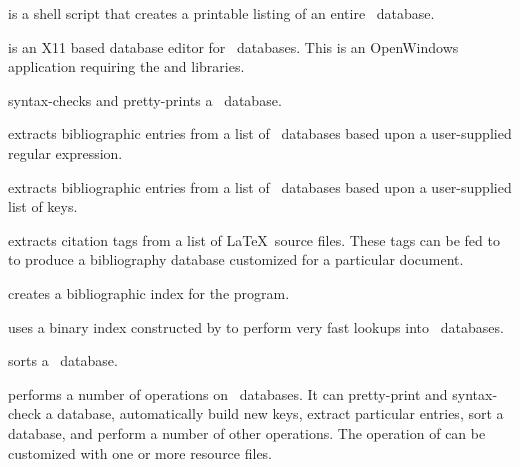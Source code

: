 
 is a shell script that creates a printable listing
of an entire \BibTeX\ database.


 is an X11 based database editor for \BibTeX\ databases.
This is an OpenWindows application requiring the  and
 libraries.


 syntax-checks
and pretty-prints a \BibTeX\ database.


 extracts bibliographic entries from a list of
\BibTeX\ databases based upon a user-supplied regular expression.


 extracts bibliographic entries from a list of
\BibTeX\ databases based upon a user-supplied list of keys.

\newpage
{}

 extracts citation tags from a list of \LaTeX\
source files.  These tags can be fed to  to produce
a bibliography database customized for a particular document.


 creates a bibliographic index for the 
program.


 uses a binary index constructed by  to 
perform very fast lookups into \BibTeX\ databases.


 sorts a \BibTeX\ database.


 performs a number of operations on \BibTeX\ databases.
It can pretty-print and syntax-check a database, automatically build
new keys, extract particular entries, sort a database, and perform a number
of other operations.  The operation of \program{bibtool} can be customized
with one or more resource files.


